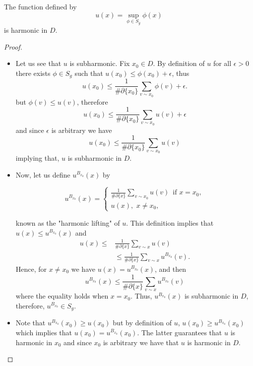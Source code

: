 \documentclass[10pt,a4paper]{amsart}
\begin{document}
\begin{theorem}
	The function defined by
	\[
	u(x)=\sup \limits_{\phi \in S_g}\phi(x) 
	\]
	is harmonic in $D$.
\end{theorem}

\begin{proof}
	\hfill
	\begin{itemize}
		\item[i)] Let us see that $u$ is subharmonic.
		Fix $x_0\in D$. By definition of $u$ for all $\epsilon >0$ there exists $\phi \in S_g$ such that $u(x_0)\leq \phi(x_0)+\epsilon$, thus
		\[
		u(x_0)\leq \frac{1}{\#\partial \{x_0\}}\sum \limits_{v\sim x_0}\phi(v)+\epsilon.
		\]
		but $\phi(v)\leq u(v)$, therefore
		\[
		u(x_0)\leq\frac{1}{\#\partial \{x_0\}}\sum \limits_{v\sim x_0}u(v)+\epsilon
		\]
		and since $\epsilon$ is arbitrary we have 
		\[
		u(x_0)\leq\frac{1}{\#\partial \{x_0\}}\sum \limits_{v\sim x_0}u(v)
		\]
		implying that, $u$ is subharmonic in $D$.
		\item[ii)] Now, let us define $u^{B_{x_0}}(x)$  by
        
		\begin{equation*}
		u^{B_{x_0}}(x)=
		\begin{cases}
		\frac{1}{\#\partial \{x\}}\sum \limits_{v\sim x_0}u(v)\,\text{ if } x=x_0,\\
		u(x), \,\, x\neq x_0,
		\end{cases}
		\end{equation*}
        
		 known as the "harmonic lifting" of $u$. This definition implies that $u(x)\leq u^{B_{x_0}}(x)$ and 
		\begin{align*}
		u(x)\leq& \frac{1}{\#\partial \{x\}}\sum \limits_{v\sim x}u(v)\\
		&\leq \frac{1}{\#\partial \{x\}}\sum \limits_{v\sim x} u^{B_{x_0}}(v).
		\end{align*}
		Hence, for $x\neq x_0$ we have $u(x)= u^{B_{x_0}}(x)$, and then
		\[
		u^{B_{x_0}}(x)\leq \frac{1}{\#\partial \{x\}}\sum \limits_{v\sim x} u^{B_{x_0}}(v)
		\]
		where the equality holds when $x=x_0$. Thus, $u^{B_{x_0}}(x)$ is subharmonic in $D$, therefore, $u^{B_{x_0}}\in S_g$.

        
		\item[iii)] Note that $u^{B_{x_0}}(x_0)\geq u(x_0)$ but by definition of $u$, $u(x_0)\geq u^{B_{x_0}}(x_0)$ which implies that $u(x_0)=u^{B_{x_0}}(x_0)$. The latter guarantees that $u$ is harmonic in $x_0$ and since $x_0$ is arbitrary we have that $u$ is harmonic in $D$.
	\end{itemize}
\end{proof}
\end{document}
